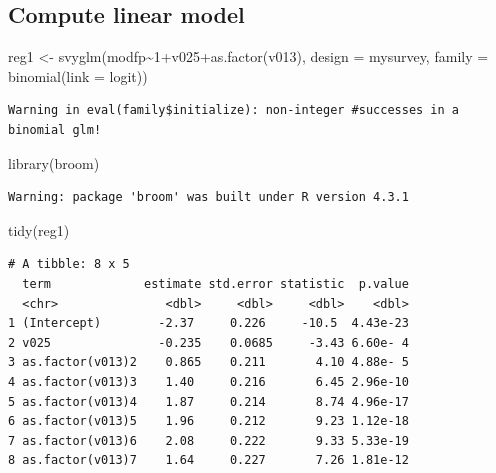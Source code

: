 \documentclass[
  letterpaper,
  DIV=11,
  numbers=noendperiod]{scrartcl}
\newenvironment{Shaded}{\begin{snugshade}}{\end{snugshade}}
\newcommand{\AttributeTok}[1]{\textcolor[rgb]{0.40,0.45,0.13}{#1}}
\newcommand{\DecValTok}[1]{\textcolor[rgb]{0.68,0.00,0.00}{#1}}
\newcommand{\FunctionTok}[1]{\textcolor[rgb]{0.28,0.35,0.67}{#1}}
\newcommand{\NormalTok}[1]{\textcolor[rgb]{0.00,0.23,0.31}{#1}}
\newcommand{\OtherTok}[1]{\textcolor[rgb]{0.00,0.23,0.31}{#1}}
\newcommand{\SpecialCharTok}[1]{\textcolor[rgb]{0.37,0.37,0.37}{#1}}
\newcommand{\StringTok}[1]{\textcolor[rgb]{0.13,0.47,0.30}{#1}}
\begin{document}
\hypertarget{compute-linear-model}{%
\subsection{Compute linear model}\label{compute-linear-model}}

\begin{Shaded}
\begin{Highlighting}[]
\NormalTok{reg1 }\OtherTok{\textless{}{-}} \FunctionTok{svyglm}\NormalTok{(modfp}\SpecialCharTok{\textasciitilde{}}\DecValTok{1}\SpecialCharTok{+}\NormalTok{v025}\SpecialCharTok{+}\FunctionTok{as.factor}\NormalTok{(v013),}
               \AttributeTok{design =}\NormalTok{ mysurvey,}
               \AttributeTok{family =} \FunctionTok{binomial}\NormalTok{(}\AttributeTok{link =} \StringTok{\textquotesingle{}logit\textquotesingle{}}\NormalTok{))}
\end{Highlighting}
\end{Shaded}

\begin{verbatim}
Warning in eval(family$initialize): non-integer #successes in a binomial glm!
\end{verbatim}

\begin{Shaded}
\begin{Highlighting}[]
\FunctionTok{library}\NormalTok{(broom)}
\end{Highlighting}
\end{Shaded}

\begin{verbatim}
Warning: package 'broom' was built under R version 4.3.1
\end{verbatim}

\begin{Shaded}
\begin{Highlighting}[]
\FunctionTok{tidy}\NormalTok{(reg1)}
\end{Highlighting}
\end{Shaded}

\begin{verbatim}
# A tibble: 8 x 5
  term             estimate std.error statistic  p.value
  <chr>               <dbl>     <dbl>     <dbl>    <dbl>
1 (Intercept)        -2.37     0.226     -10.5  4.43e-23
2 v025               -0.235    0.0685     -3.43 6.60e- 4
3 as.factor(v013)2    0.865    0.211       4.10 4.88e- 5
4 as.factor(v013)3    1.40     0.216       6.45 2.96e-10
5 as.factor(v013)4    1.87     0.214       8.74 4.96e-17
6 as.factor(v013)5    1.96     0.212       9.23 1.12e-18
7 as.factor(v013)6    2.08     0.222       9.33 5.33e-19
8 as.factor(v013)7    1.64     0.227       7.26 1.81e-12
\end{verbatim}
\end{document}
